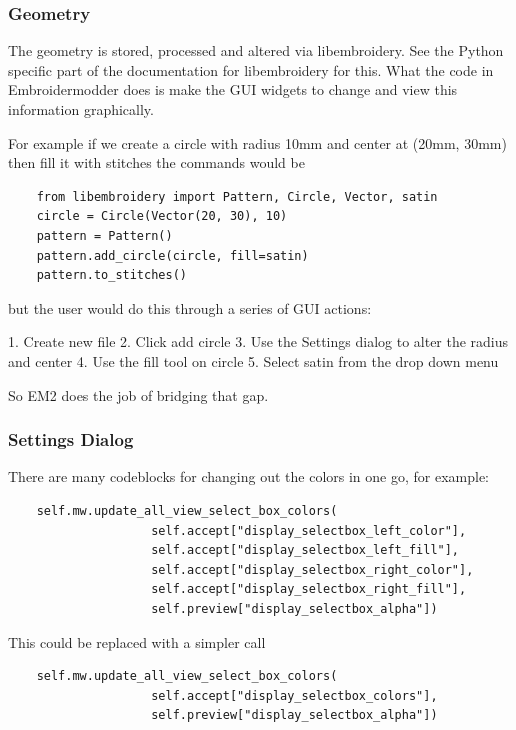 \documentclass[a4paper, 11pt]{report}
\begin{document}
\subsubsection{Geometry}

The geometry is stored, processed and altered via libembroidery. See the Python specific part of the documentation for libembroidery for this. What the code in Embroidermodder does is make the GUI widgets to change and view this information graphically.

For example if we create a circle with radius 10mm and center at (20mm, 30mm) then fill it with stitches the commands would be

\begin{verbatim}
    from libembroidery import Pattern, Circle, Vector, satin
    circle = Circle(Vector(20, 30), 10)
    pattern = Pattern()
    pattern.add_circle(circle, fill=satin)
    pattern.to_stitches()
\end{verbatim}

but the user would do this through a series of GUI actions:

1. Create new file
2. Click add circle
3. Use the Settings dialog to alter the radius and center
4. Use the fill tool on circle
5. Select satin from the drop down menu

So EM2 does the job of bridging that gap.

\subsubsection{Settings Dialog}

There are many codeblocks for changing out the colors in one go, for example:
    
\begin{verbatim}
    self.mw.update_all_view_select_box_colors(
                    self.accept["display_selectbox_left_color"],
                    self.accept["display_selectbox_left_fill"],
                    self.accept["display_selectbox_right_color"],
                    self.accept["display_selectbox_right_fill"],
                    self.preview["display_selectbox_alpha"])
\end{verbatim}

This could be replaced with a simpler call

\begin{verbatim}
    self.mw.update_all_view_select_box_colors(
                    self.accept["display_selectbox_colors"],
                    self.preview["display_selectbox_alpha"])
\end{verbatim}
\end{document}
